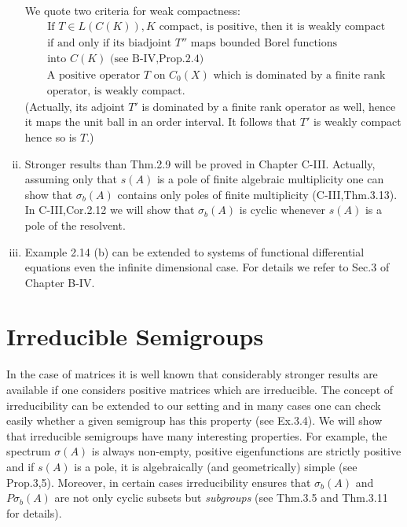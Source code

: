 \begin{remarks}
\begin{enumerate}[(i)]
	We quote two criteria for weak compactness:
	\begin{equation}\label{eq:b3-2.31}
		\begin{split}
		&\text{If } T \in L(C(K)), K \text{ compact, is positive, then it is weakly compact }\\ 
		&\text{if and only if its biadjoint } T'' \text{ maps bounded}
		\text{ Borel functions }  \\ 
		&\text{into } C(K) \text{ (see B-IV,Prop.2.4)}
		\end{split}
	\end{equation}
	\begin{equation}\label{eq:b3-2.32}
		\begin{split}	
		&\text{A positive operator } T \text{ on } C_{0}(X) \text{ which is dominated by a finite rank } \\
		&\text{operator, is weakly compact. }
		\end{split}
	\end{equation}
	(Actually, its adjoint  $T'$ is dominated by a finite rank operator as well, hence it maps the unit ball in an order interval. 
	It follows that $ T' $  is weakly compact hence so is $T$.)		
	
		
	\item 
	Stronger results than Thm.2.9 will be proved in Chapter C-III.
	Actually, assuming only that $s(A)$ is a pole of finite algebraic multiplicity one can show that $\sigma_{b}(A)$ contains only poles of finite multiplicity (C-III,Thm.3.13).
	In C-III,Cor.2.12 we will show that $\sigma_{b}(A)$ is cyclic whenever $s(A)$ is a pole of the resolvent.
	
	\item 
	Example 2.14 (b) can be extended to systems of functional differential equations even the infinite dimensional case.
	For details we refer to Sec.3 of Chapter B-IV.
\end{enumerate}	
\end{remarks}
%
%
\section{Irreducible Semigroups}
In the case of matrices it is well known that considerably stronger results are available if one considers positive matrices which are irreducible. The concept of irreducibility can be extended to our setting and in many cases one can check easily whether a given semi­group has this property (see Ex.3.4). We will show that irreducible semigroups have many interesting properties. For example, the spectrum $\sigma(A)$ is always non-empty, positive eigenfunctions are strictly positive and if $s(A)$ is a pole, it is algebraically (and geometri­cally) simple (see Prop.3,5). Moreover, in certain cases irreducibili­ty ensures that $\sigma_{b}(A)$ and $P\sigma_{b}(A)$ are not only cyclic subsets but \emph{subgroups} (see Thm.3.5 and Thm.3.11 for details). 

